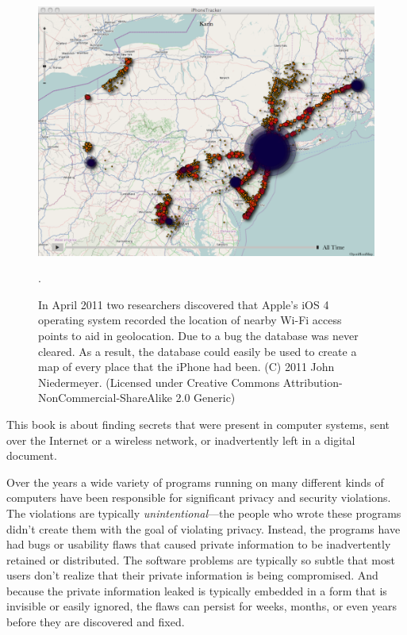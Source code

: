 \begin{figure}
\includegraphics[width=\textwidth]{ch-1/5637893141_ba59f2d989_o.png}
\caption{In April 2011 two researchers discovered that Apple's iOS 4
  operating system recorded the location of nearby Wi-Fi access points
  to aid in geolocation. Due to a bug the database was never
  cleared. As a result, the database could easily be used to create a
  map of every place that the iPhone had been. (C) 2011 John
  Niedermeyer. {\small (Licensed under Creative Commons
  Attribution-NonCommercial-ShareAlike 2.0 Generic)}}.\label{heatmap}
\end{figure}


This book is about finding secrets that were present in computer
systems, sent over the Internet or a wireless network, or
inadvertently left in a digital document. 

Over the years a wide variety of programs running on many different
kinds of computers have been responsible for significant privacy and
security violations. The violations are typically
\emph{unintentional}---the people who wrote these programs didn't
create them with the goal of violating privacy. Instead, the programs
have had bugs or usability flaws that caused private information to be
inadvertently retained or distributed. The software problems are
typically so subtle that most users don't realize that their private
information is being compromised. And because the private information
leaked is typically embedded in a form that is invisible or easily
ignored, the flaws can persist for weeks, months, or even years before
they are discovered and fixed.

